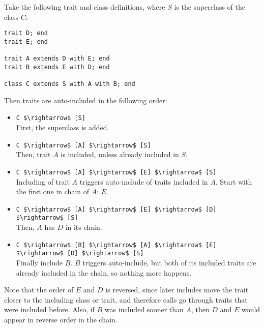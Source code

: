 \example Take the following trait and class definitions, where $S$ is the superclass of the class $C$:
\begin{lstlisting}
trait D; end
trait E; end

trait A extends D with E; end
trait B extends E with D; end

class C extends S with A with B; end
\end{lstlisting}
Then traits are auto-included in the following order:
\begin{itemize}
\item
\lstinline!C $\rightarrow$ [S]! \\
First, the superclass is added. 

\item
\lstinline!C $\rightarrow$ [A] $\rightarrow$ [S]! \\
Then, trait $A$ is included, unless already included in $S$. 

\item
\lstinline!C $\rightarrow$ [A] $\rightarrow$ [E] $\rightarrow$ [S]! \\
Including of trait $A$ triggers auto-include of traits included in $A$. Start with the first one in chain of $A$: $E$. 

\item
\lstinline!C $\rightarrow$ [A] $\rightarrow$ [E] $\rightarrow$ [D] $\rightarrow$ [S]! \\
Then, $A$ has $D$ in its chain. 

\item
\lstinline!C $\rightarrow$ [B] $\rightarrow$ [A] $\rightarrow$ [E] $\rightarrow$ [D] $\rightarrow$ [S]! \\
Finally include $B$. $B$ triggers auto-include, but both of its included traits are already included in the chain, so nothing more happens. 
\end{itemize}
Note that the order of $E$ and $D$ is reversed, since later includes move the trait closer to the including class or trait, and therefore  calls go through traits that were included before. Also, if $B$ was included sooner than $A$, then $D$ and $E$ would appear in reverse order in the chain. 

